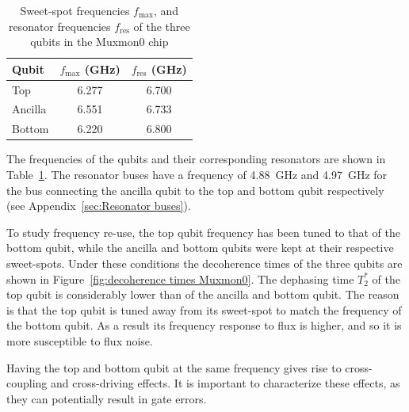       \begin{table}
        \begin{tabular}{l c c}
          \toprule
          Qubit  & $f_\text{max}$ (GHz) & $f_\text{res}$ (GHz)\\
          \midrule
          Top    & 6.277                & 6.700 \\
          Ancilla& 6.551                & 6.733 \\
          Bottom & 6.220                & 6.800 \\
          \bottomrule
        \end{tabular}
        \caption{Sweet-spot frequencies $f_\text{max}$, and resonator frequencies $f_\text{res}$ of the three qubits in the Muxmon0 chip}
        \label{tab:Muxmon0 qubit properties}
      \end{table}

      The frequencies of the qubits and their corresponding resonators are shown in Table~\ref{tab:Muxmon0 qubit properties}. The resonator buses have a frequency of \SI{4.88}{\giga \hertz} and \SI{4.97}{\giga \hertz} for the bus connecting the ancilla qubit to the top and bottom qubit respectively (see Appendix~\ref{sec:Resonator buses}).

      To study frequency re-use, the top qubit frequency has been tuned to that of the bottom qubit, while the ancilla and bottom qubits were kept at their respective sweet-spots. Under these conditions the decoherence times of the three qubits are shown in Figure~\ref{fig:decoherence times Muxmon0}. The dephasing time $T_2^*$ of the top qubit is considerably lower than of the ancilla and bottom qubit. The reason is that the top qubit is tuned away from its sweet-spot to match the frequency of the bottom qubit. As a result its frequency response to flux is higher, and so it is more susceptible to flux noise.

      Having the top and bottom qubit at the same frequency gives rise to cross-coupling and cross-driving effects. It is important to characterize these effects, as they can potentially result in gate errors.

